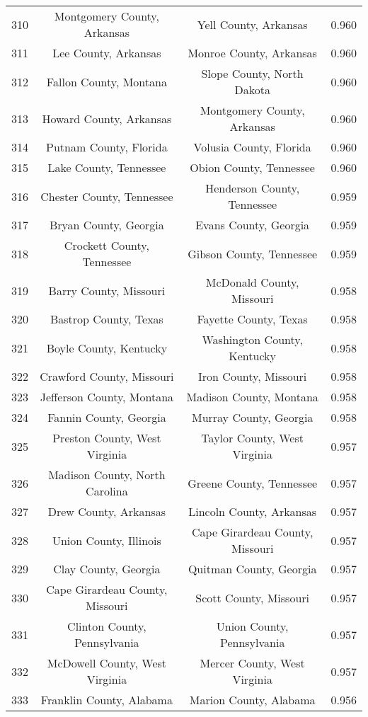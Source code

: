 \begin{longtable}{cccc}
  310 & Montgomery County, Arkansas & Yell County, Arkansas & 0.960 \\ 
  311 & Lee County, Arkansas & Monroe County, Arkansas & 0.960 \\ 
  312 & Fallon County, Montana & Slope County, North Dakota & 0.960 \\ 
  313 & Howard County, Arkansas & Montgomery County, Arkansas & 0.960 \\ 
  314 & Putnam County, Florida & Volusia County, Florida & 0.960 \\ 
  315 & Lake County, Tennessee & Obion County, Tennessee & 0.960 \\ 
  316 & Chester County, Tennessee & Henderson County, Tennessee & 0.959 \\ 
  317 & Bryan County, Georgia & Evans County, Georgia & 0.959 \\ 
  318 & Crockett County, Tennessee & Gibson County, Tennessee & 0.959 \\ 
  319 & Barry County, Missouri & McDonald County, Missouri & 0.958 \\ 
  320 & Bastrop County, Texas & Fayette County, Texas & 0.958 \\ 
  321 & Boyle County, Kentucky & Washington County, Kentucky & 0.958 \\ 
  322 & Crawford County, Missouri & Iron County, Missouri & 0.958 \\ 
  323 & Jefferson County, Montana & Madison County, Montana & 0.958 \\ 
  324 & Fannin County, Georgia & Murray County, Georgia & 0.958 \\ 
  325 & Preston County, West Virginia & Taylor County, West Virginia & 0.957 \\ 
  326 & Madison County, North Carolina & Greene County, Tennessee & 0.957 \\ 
  327 & Drew County, Arkansas & Lincoln County, Arkansas & 0.957 \\ 
  328 & Union County, Illinois & Cape Girardeau County, Missouri & 0.957 \\ 
  329 & Clay County, Georgia & Quitman County, Georgia & 0.957 \\ 
  330 & Cape Girardeau County, Missouri & Scott County, Missouri & 0.957 \\ 
  331 & Clinton County, Pennsylvania & Union County, Pennsylvania & 0.957 \\ 
  332 & McDowell County, West Virginia & Mercer County, West Virginia & 0.957 \\ 
  333 & Franklin County, Alabama & Marion County, Alabama & 0.956 \\ 

\end{longtable}
